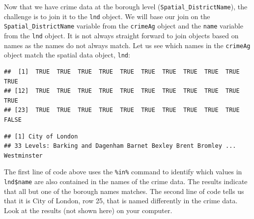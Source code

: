 \documentclass[]{article}
\newenvironment{Shaded}{}{}
\newcommand{\KeywordTok}[1]{\textcolor[rgb]{0.00,0.44,0.13}{\textbf{{#1}}}}
\newcommand{\CommentTok}[1]{\textcolor[rgb]{0.38,0.63,0.69}{\textit{{#1}}}}
\newcommand{\NormalTok}[1]{{#1}}
\begin{document}
Now that we have crime data at the borough level
(\texttt{Spatial\_DistrictName}), the challenge is to join it to the
\texttt{lnd} object. We will base our join on the
\texttt{Spatial\_DistrictName} variable from the \texttt{crimeAg} object
and the \texttt{name} variable from the \texttt{lnd} object. It is not
always straight forward to join objects based on names as the names do
not always match. Let us see which names in the \texttt{crimeAg} object
match the spatial data object, \texttt{lnd}:

\begin{Shaded}
\end{Shaded}
\begin{verbatim}
##  [1]  TRUE  TRUE  TRUE  TRUE  TRUE  TRUE  TRUE  TRUE  TRUE  TRUE  TRUE
## [12]  TRUE  TRUE  TRUE  TRUE  TRUE  TRUE  TRUE  TRUE  TRUE  TRUE  TRUE
## [23]  TRUE  TRUE  TRUE  TRUE  TRUE  TRUE  TRUE  TRUE  TRUE  TRUE FALSE
\end{verbatim}
\begin{Shaded}
\end{Shaded}
\begin{verbatim}
## [1] City of London
## 33 Levels: Barking and Dagenham Barnet Bexley Brent Bromley ... Westminster
\end{verbatim}
The first line of code above uses the \texttt{\%in\%} command to
identify which values in \texttt{lnd\$name} are also contained in the
names of the crime data. The results indicate that all but one of the
borough names matches. The second line of code tells us that it is City
of London, row 25, that is named differently in the crime data. Look at
the results (not shown here) on your computer.
\end{document}
